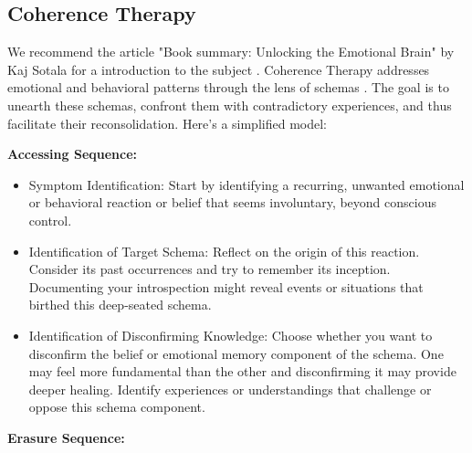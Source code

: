 \documentclass[12pt,letterpaper]{article}
\begin{document}
\subsection{Coherence Therapy}
We recommend the article "Book summary: Unlocking the Emotional Brain" by Kaj Sotala for a introduction to the subject \cite{lesswrongCoherenceTherapy}.
Coherence Therapy addresses emotional and behavioral patterns through the lens of schemas \cite{eckerUnlocking}. The goal is to unearth these schemas, confront them with contradictory experiences, and thus facilitate their reconsolidation. Here's a simplified model:  

\noindent \textbf{Accessing Sequence:}
\begin{itemize}
    \item Symptom Identification: Start by identifying a recurring, unwanted emotional or behavioral reaction or belief that seems involuntary, beyond conscious control.
    \item Identification of Target Schema: Reflect on the origin of this reaction. Consider its past occurrences and try to remember its inception. Documenting your introspection might reveal events or situations that birthed this deep-seated schema. 
    \item Identification of Disconfirming Knowledge: Choose whether you want to disconfirm the belief or emotional memory component of the schema. One may feel more fundamental than the other and disconfirming it may provide deeper healing. Identify experiences or understandings that challenge or oppose this schema component. 
\end{itemize}
\noindent \textbf{Erasure Sequence:}
\end{document}
